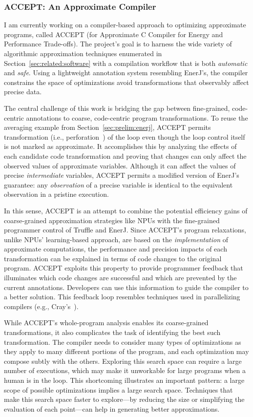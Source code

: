 \subsubsection{ACCEPT: An Approximate Compiler}

I am currently working on a compiler-based approach to optimizing approximate
programs, called ACCEPT (for Approximate C Compiler for Energy and Performance
Trade-offs). The project's goal is to harness the wide variety of
algorithmic approximation techniques enumerated in
Section~\ref{sec:related:software} with a compilation workflow that is both
\emph{automatic} and \emph{safe}. Using a lightweight annotation system
resembling EnerJ's, the compiler constrains the space of optimizations avoid
transformations that observably affect precise data.

The central challenge of this work is bridging the gap between fine-grained,
code-centric annotations to coarse, code-centric program transformations. To
reuse the averaging example from Section~\ref{sec:prelim:enerj}, ACCEPT
permits transformation (i.e., perforation~\cite{perforation}) of the
 loop even though the loop control itself is not marked as
approximate. It accomplishes this by analyzing the effects of each candidate
code transformation and proving that changes can only affect the
observed values of approximate variables. Although it can affect the values of
precise \emph{intermediate} variables, ACCEPT permits a modified version of
EnerJ's guarantee: any \emph{observation} of a precise variable is identical
to the equivalent observation in a pristine execution.

In this sense, ACCEPT is an attempt to combine the potential efficiency gains
of coarse-grained approximation strategies like NPUs with the fine-grained
programmer control of Truffle and EnerJ. Since ACCEPT's program relaxations,
unlike NPUs' learning-based approach, are based on the \emph{implementation}
of approximate computations, the performance and precision impacts of each
transformation can be explained in terms of code changes to the original
program. ACCEPT exploits this property to provide programmer feedback that
illuminates which code changes are successful and which are prevented by the
current annotations. Developers can use this information to guide the compiler
to a better solution. This feedback loop resembles techniques used in
parallelizing compilers (e.g., Cray's~\cite{canal}).

While ACCEPT's whole-program analysis enables its coarse-grained
transformations, it also complicates the task of identifying the best such
transformation. The compiler needs to consider many types of optimizations as
they apply to many different portions of the program, and each optimization
may compose subtly with the others. Exploring this search space can require
a large number of executions, which may make it unworkable for large programs
when a human is in the loop. This shortcoming illustrates an important
pattern: a large scope of possible optimizations implies a large search space.
Techniques that make this search space faster to explore---by reducing the
size or simplifying the evaluation of each point---can help in generating
better approximations.



